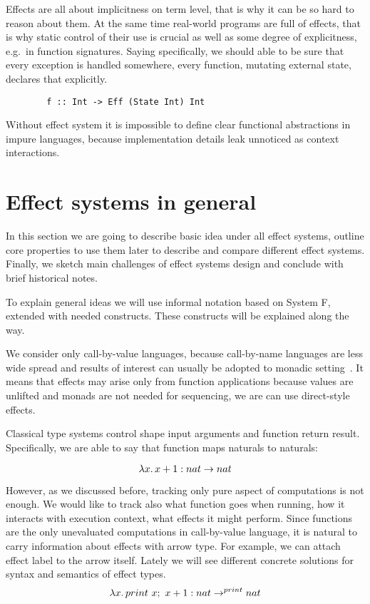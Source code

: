 \documentclass[conference]{IEEEtran}
\newcommand{\seq}{;~}
\newcommand{\ap}{~}
\begin{document}

    Effects are all about implicitness on term level, that is why it can be so hard to reason about them.
    At the same time real-world programs are full of effects, that is why static control of their use is crucial as well as some degree of explicitness, e.g.\ in function signatures.
    Saying specifically, we should able to be sure that every exception is handled somewhere, every function, mutating external state, declares that explicitly.

    \begin{verbatim}
        f :: Int -> Eff (State Int) Int
    \end{verbatim}

    Without effect system it is impossible to define clear functional abstractions in impure languages, because implementation details leak unnoticed as context interactions.


    \section{Effect systems in general}

    In this section we are going to describe basic idea under all effect systems, outline core properties to use them later to describe and compare different effect systems.
    Finally, we sketch main challenges of effect systems design and conclude with brief historical notes.

    To explain general ideas we will use informal notation based on System F, extended with needed constructs.
    These constructs will be explained along the way.

    We consider only call-by-value languages, because call-by-name languages are less wide spread and results of interest can usually be adopted to monadic setting~\cite{wadler2003marriage}.
    It means that effects may arise only from function applications because values are unlifted and monads are not needed for sequencing, we are can use direct-style effects.

    Classical type systems control shape input arguments and function return result.
    Specifically, we are able to say that function maps naturals to naturals:

    \[\lambda x\ldotp x + 1 : nat\to nat\]

    However, as we discussed before, tracking only pure aspect of computations is not enough.
    We would like to track also what function goes when running, how it interacts with execution context, what effects it might perform.
    Since functions are the only unevaluated computations in call-by-value language, it is natural to carry information about effects with arrow type.
    For example, we can attach effect label to the arrow itself.
    Lately we will see different concrete solutions for syntax and semantics of effect types.
    \[\lambda x\ldotp print \ap x\seq x + 1 : nat\to^{print} nat\]
\end{document}
